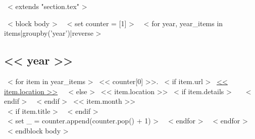 ~< extends "section.tex" >~

~< block body >~
  ~< set counter = [1] >~
  ~< for year, year_items in items|groupby('year')|reverse >~
    \subsection*{<< year >>}
    ~< for item in year_items >~
      << counter[0] >>. ~< if item.url >~
        \href{<< item.url >>}{<< item.location >>}
        \,\, {\scriptsize
          \color{gray}{<< item.details >>}
        }
      ~< else >~
        << item.location >>
        ~< if item.details >~
        \,\, {\scriptsize
          \color{gray}{<< item.details >>}
        }
        ~< endif >~
      ~< endif >~
      \hfill << item.month >>\\
      ~< if item.title >~
      {\scriptsize
        \textit{\color{gray}{<< item.title >>}}
      } \vspace{3mm}
      ~< endif >~ \\
      ~< set _ = counter.append(counter.pop() + 1) >~
    ~< endfor >~
  ~< endfor >~
~< endblock body >~